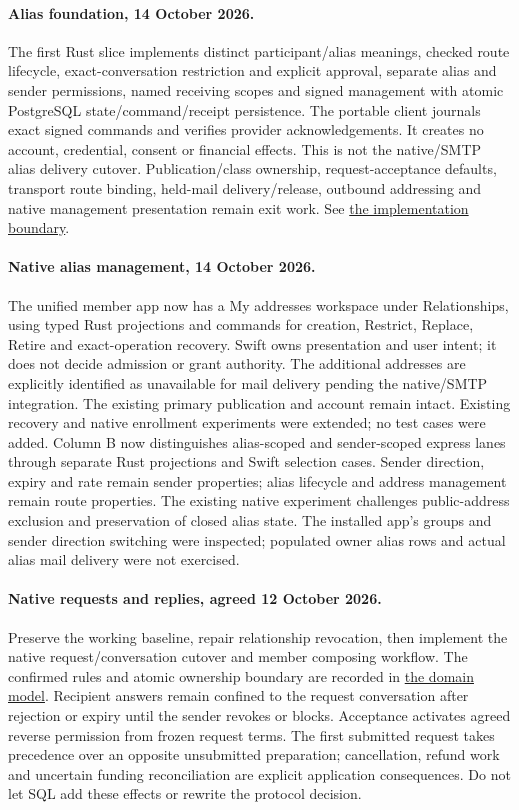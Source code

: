 \documentclass[11pt]{article}
\begin{document}
\paragraph{Alias foundation, 14 October 2026.}
The first Rust slice implements distinct participant/alias meanings, checked route
lifecycle, exact-conversation restriction and explicit approval, separate alias and
sender permissions, named receiving scopes and signed management with atomic
PostgreSQL state/command/receipt persistence. The portable client journals exact
signed commands and verifies provider acknowledgements. It creates no account,
credential, consent or financial effects. This is not the native/SMTP alias delivery
cutover. Publication/class ownership, request-acceptance defaults, transport route
binding, held-mail delivery/release, outbound addressing and native management
presentation remain exit work. See
\href{docs/application-persistence-boundaries.md}{the implementation boundary}.

\paragraph{Native alias management, 14 October 2026.}
The unified member app now has a My addresses workspace under Relationships,
using typed Rust projections and commands for creation, Restrict, Replace, Retire
and exact-operation recovery. Swift owns presentation and user intent; it does not
decide admission or grant authority. The additional addresses are explicitly
identified as unavailable for mail delivery pending the native/SMTP integration.
The existing primary publication and account remain intact. Existing recovery
and native enrollment experiments were extended; no test cases were added.
Column B now distinguishes alias-scoped and sender-scoped express lanes through
separate Rust projections and Swift selection cases. Sender direction, expiry
and rate remain sender properties; alias lifecycle and address management remain
route properties. The existing native experiment challenges public-address
exclusion and preservation of closed alias state. The installed app's groups and
sender direction switching were inspected; populated owner alias rows and actual
alias mail delivery were not exercised.

\paragraph{Native requests and replies, agreed 12 October 2026.}
Preserve the working baseline, repair relationship revocation, then implement
the native request/conversation cutover and member composing workflow. The
confirmed rules and atomic ownership boundary are recorded in
\href{DOMAIN_MODEL.md}{the domain model}. Recipient answers remain confined to
the request conversation after rejection or expiry until the sender revokes or
blocks. Acceptance activates agreed reverse permission from frozen request terms.
The first submitted request takes precedence over an opposite unsubmitted
preparation; cancellation, refund work and uncertain funding reconciliation are
explicit application consequences. Do not let SQL add these effects or rewrite
the protocol decision.
\end{document}
